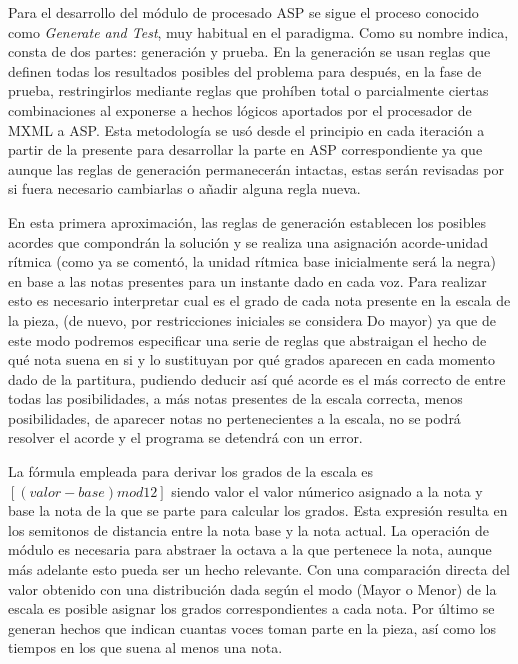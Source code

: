Para el desarrollo del módulo de procesado ASP se sigue el proceso conocido como \textit{Generate and Test}, muy habitual en el paradigma. Como su nombre indica, consta de dos partes: generación y prueba. En la generación se usan reglas que definen todas los resultados posibles del problema para después, en la fase de prueba, restringirlos mediante reglas que prohíben total o parcialmente ciertas combinaciones al exponerse a hechos lógicos aportados por el procesador de MXML a ASP. Esta metodología se usó desde el principio en cada iteración a partir de la presente para desarrollar la parte en ASP correspondiente ya que aunque las reglas de generación permanecerán intactas, estas serán revisadas por si fuera necesario cambiarlas o añadir alguna regla nueva.

En esta primera aproximación, las reglas de generación establecen los posibles acordes que compondrán la solución y se realiza una asignación acorde-unidad rítmica (como ya se comentó, la unidad rítmica base inicialmente será la negra) en base a las notas presentes para un instante dado en cada voz. Para realizar esto es necesario interpretar cual es el grado de cada nota presente en la escala de la pieza, (de nuevo, por restricciones iniciales se considera Do mayor) ya que de este modo podremos especificar una serie de reglas que abstraigan el hecho de qué nota suena en si y lo sustituyan por qué grados aparecen en cada momento dado de la partitura, pudiendo deducir así qué acorde es el más correcto de entre todas las posibilidades, a más notas presentes de la escala correcta, menos posibilidades, de aparecer notas no pertenecientes a la escala, no se podrá resolver el acorde y el programa se detendrá con un error.

La fórmula empleada para derivar los grados de la escala es $[(valor-base) mod 12]$ siendo valor el valor númerico asignado a la nota y base la nota de la que se parte para calcular los grados. Esta expresión resulta en los semitonos de distancia entre la nota base y la nota actual. La operación de módulo es necesaria para abstraer la octava a la que pertenece la nota, aunque más adelante esto pueda ser un hecho relevante. Con una comparación directa del valor obtenido con una distribución dada según el modo (Mayor o Menor) de la escala es posible asignar los grados correspondientes a cada nota. Por último se generan hechos que indican cuantas voces toman parte en la pieza, así como los tiempos en los que suena al menos una nota.

